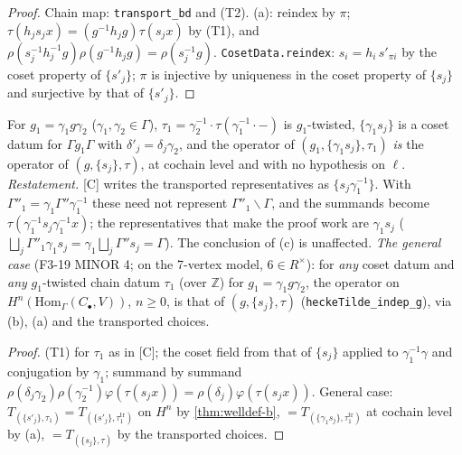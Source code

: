 \begin{proof}
  \leanok
  Chain map: \texttt{transport\_bd} and (T2). (a): reindex by $\pi$; $\tau(h_js_jx)=(g^{-1}h_jg)\tau(s_jx)$ by (T1),
  and $\rho(s_j^{-1}h_j^{-1}g)\rho(g^{-1}h_jg)=\rho(s_j^{-1}g)$. \texttt{CosetData.reindex}: $s_i=h_i\,s'_{\pi i}$ by the coset
  property of $\{s'_j\}$; $\pi$ is injective by uniqueness in the coset property of $\{s_j\}$ and surjective by that of $\{s'_j\}$.
\end{proof}

\begin{theorem}\label{thm:welldef-c}
  \leanok
  For $g_1=\gamma_1g\gamma_2$ ($\gamma_1,\gamma_2\in\Gamma$), $\tau_1=\gamma_2^{-1}\cdot\tau(\gamma_1^{-1}\cdot-)$ is $g_1$-twisted,
  $\{\gamma_1s_j\}$ is a coset datum for $\Gamma g_1\Gamma$ with $\delta'_j=\delta_j\gamma_2$, and the operator of
  $(g_1,\{\gamma_1s_j\},\tau_1)$ \emph{is} the operator of $(g,\{s_j\},\tau)$, at cochain level and with no hypothesis on $\ell$.
  \emph{Restatement.} [C] writes the transported representatives as $\{s_j\gamma_1^{-1}\}$. With
  $\Gamma''_1=\gamma_1\Gamma''\gamma_1^{-1}$ these need not represent $\Gamma''_1\backslash\Gamma$, and the summands become
  $\tau(\gamma_1^{-1}s_j\gamma_1^{-1}x)$; the representatives that make the proof work are $\gamma_1s_j$
  ($\bigsqcup_j\Gamma''_1\gamma_1s_j=\gamma_1\bigsqcup_j\Gamma''s_j=\Gamma$). The conclusion of (c) is unaffected.
  \emph{The general case} (F3-19 MINOR 4; on the 7-vertex model, $6\in R^\times$): for \emph{any} coset datum and \emph{any}
  $g_1$-twisted chain datum $\tau_1$ (over $\mathbb Z$) for $g_1=\gamma_1g\gamma_2$, the operator on
  $H^n(\mathrm{Hom}_\Gamma(C_\bullet,V))$, $n\ge0$, is that of $(g,\{s_j\},\tau)$ (\texttt{heckeTilde\_indep\_g}), via (b), (a) and
  the transported choices.
\end{theorem}
\begin{proof}
  \leanok
  (T1) for $\tau_1$ as in [C]; the coset field from that of $\{s_j\}$ applied to $\gamma_1^{-1}\gamma$ and conjugation by
  $\gamma_1$; summand by summand $\rho(\delta_j\gamma_2)\rho(\gamma_2^{-1})\varphi(\tau(s_jx))=\rho(\delta_j)\varphi(\tau(s_jx))$.
  General case: $T_{(\{s'_j\},\tau_1)}=T_{(\{s'_j\},\tau_1^{\mathrm{tr}})}$ on $H^n$ by \ref{thm:welldef-b}, $=T_{(\{\gamma_1s_j\},\tau_1^{\mathrm{tr}})}$
  at cochain level by (a), $=T_{(\{s_j\},\tau)}$ by the transported choices.
\end{proof}

